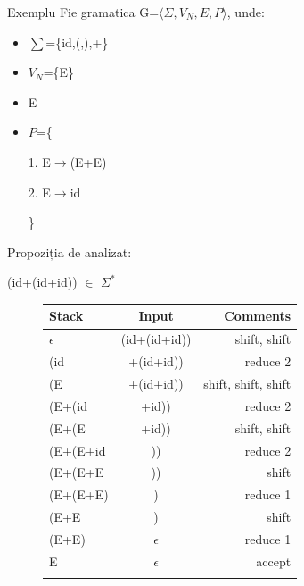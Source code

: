 \documentclass[pdf]{beamer}
\begin{document}
\begin{frame}{Exemplu}
Fie gramatica G=$\langle \Sigma, V_N, E, P \rangle$, unde:

\begin{itemize}
\item
$\sum$=\{id,(,),+\}
\item
$V_N$=\{E\}
\item
E
\item
$P$=\{

\hspace{1cm} 1. E$\rightarrow$(E+E)

\hspace{1cm} 2. E$\rightarrow$id

\}
\end{itemize}

Propoziția de analizat:

(id+(id+id)) $\in$ $\Sigma^{*}$
\end{frame}



\begin{frame}
\begin{figure}[h!]
\centering
\begin{tabular}{ l c r  }
      Stack     &            Input &            Comments \\
   \hline
  $\epsilon$    & (id+(id+id)) &  shift, shift \\
  (id & +(id+id)) & reduce 2 \\
  (E & +(id+id)) &  shift, shift, shift \\
  (E+(id & +id)) & reduce 2 \\
  (E+(E & +id)) & shift, shift \\
  (E+(E+id & )) & reduce 2 \\
  (E+(E+E & )) & shift \\
  (E+(E+E) & ) & reduce 1 \\
  (E+E & ) & shift \\
  (E+E)& $\epsilon$ & reduce 1 \\
   E & $\epsilon$ & accept \\\\
\end{tabular}
\end{figure}
\end{frame}
\end{document}
